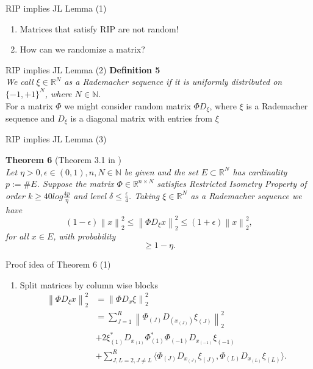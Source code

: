 \documentclass{beamer}
\newcommand\norm[1]{\left\lVert#1\right\rVert}
\newcommand*\by{{\times}}
\begin{document}
\begin{frame}{RIP implies JL Lemma (1)}
\begin{enumerate}
    \item Matrices that satisfy RIP are not random!
    
    \item How can we randomize a matrix?
\end{enumerate}

\end{frame}

\begin{frame}{RIP implies JL Lemma (2)}
    \noindent
{\bf Definition 5} \\
{\it We call $\xi \in \mathbb{R}^N$ as a Rademacher sequence if it is uniformly distributed on $\{-1, +1\}^N$, where $N \in \mathbb{N}$. } 
\\[1cm] \pause
For a matrix $\Phi$ we might consider random matrix $\Phi D_{\xi}$, where $\xi$ is a Rademacher sequence and $D_{\xi}$ is a diagonal matrix with entries from $\xi$

\end{frame} 


\begin{frame}{RIP implies JL Lemma (3)}

\noindent
{\bf Theorem 6} (Theorem 3.1 in \citep{Khramer}) \\
{\it
Let $\eta > 0, \epsilon \in (0, 1), n, N \in \mathbb{N}$ be given and the set $E \subset \mathbb{R}^N$ has cardinality $p := \#E$. Suppose the matrix $\Phi \in \mathbb{R}^{n \by N}$ satisfies Restricted Isometry Property of order $k \geq 40log\frac{4p}{\eta}$ and level $\delta \leq \frac{\epsilon}{4}$. Taking $\xi \in \mathbb{R}^N$ as a Rademacher sequence we have 
\begin{equation}
    \label{eqn:iso_jl1}
    (1 - \epsilon) \norm{x}_2^2 \leq \norm{\Phi D_{\xi}x}_2^2 \leq (1 + \epsilon) \norm{x}_2^2,
\end{equation}
for all $x \in E$, with probability
$$
 \geq 1- \eta.
$$
}
    
\end{frame}

\begin{frame}{Proof idea of Theorem 6 (1)}
    \begin{enumerate}[1]
        \item Split matrices by column wise blocks
        \begin{equation}
    \label{eqn:iso_jl4}
    \begin{split}
    \norm{\Phi D_{\xi}x}_2^2 & = \norm{\Phi D_{x}\xi}_2^2 \\
    & = \sum_{J=1}^R \norm{\Phi_{(J)} D_{(x_{(J)})} \xi_{(J)}}_2^2 \\
    & + 2 \xi_{(1)}^* D_{x_{(1)}} \Phi_{(1)}^* \Phi_{(-1)} D_{x_{(-1)}} \xi_{(-1)} \\
    & + \sum_{J,L = 2, J \not = L }^R \langle \Phi_{(J)} D_{x_{(J)}} \xi_{(J)}, \Phi_{(L)} D_{x_{(L)}} \xi_{(L)} \rangle.
    \end{split}
\end{equation}
    \end{enumerate}
\end{frame}
\end{document}

